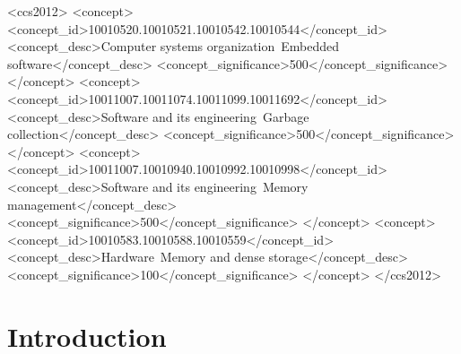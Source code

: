 \documentclass[acmsmall,screen]{acmart}
\newif\ifincludesimulation
\begin{document}
\begin{CCSXML}
<ccs2012>
<concept>
<concept_id>10010520.10010521.10010542.10010544</concept_id>
<concept_desc>Computer systems organization~Embedded software</concept_desc>
<concept_significance>500</concept_significance>
</concept>
<concept>
<concept_id>10011007.10011074.10011099.10011692</concept_id>
<concept_desc>Software and its engineering~Garbage collection</concept_desc>
<concept_significance>500</concept_significance>
</concept>
<concept>
<concept_id>10011007.10010940.10010992.10010998</concept_id>
<concept_desc>Software and its engineering~Memory management</concept_desc>
<concept_significance>500</concept_significance>
</concept>
<concept>
<concept_id>10010583.10010588.10010559</concept_id>
<concept_desc>Hardware~Memory and dense storage</concept_desc>
<concept_significance>100</concept_significance>
</concept>
</ccs2012>
\end{CCSXML}



\maketitle

\ifincludesimulation
\begin{center}
\fcolorbox{red}{yellow!15}{\parbox{0.92\linewidth}{\centering\bfseries
SIMULATION-ONLY INTERNAL DRAFT---NOT FOR SUBMISSION. All Results values are
generated from prospective targets and must be replaced by observed runs.}}
\end{center}
\fi

\section{Introduction}
\label{sec:intro}
\end{document}

